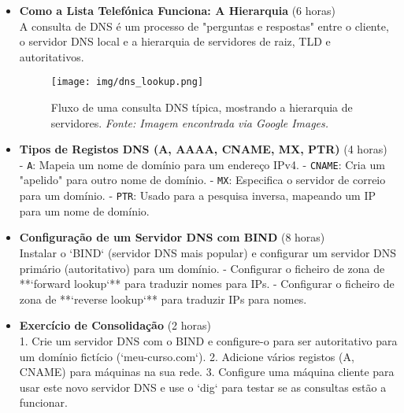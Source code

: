 \documentclass[10pt,a4paper]{article}
\begin{document}
	\begin{itemize}
		\item \textbf{Como a Lista Telefónica Funciona: A Hierarquia} (6 horas) \\
		A consulta de DNS é um processo de "perguntas e respostas" entre o cliente, o servidor DNS local e a hierarquia de servidores de raiz, TLD e autoritativos.
		
		\begin{figure}[h]
			\centering
			\texttt{[image: img/dns\_lookup.png]}
			\caption{Fluxo de uma consulta DNS típica, mostrando a hierarquia de servidores. \textit{Fonte: Imagem encontrada via Google Images.}}
			\label{fig:dns_lookup}
		\end{figure}
		
		\item \textbf{Tipos de Registos DNS (A, AAAA, CNAME, MX, PTR)} (4 horas) \\
		- \texttt{A}: Mapeia um nome de domínio para um endereço IPv4.
		- \texttt{CNAME}: Cria um "apelido" para outro nome de domínio.
		- \texttt{MX}: Especifica o servidor de correio para um domínio.
		- \texttt{PTR}: Usado para a pesquisa inversa, mapeando um IP para um nome de domínio.
		
		\item \textbf{Configuração de um Servidor DNS com BIND} (8 horas) \\
		Instalar o `BIND` (servidor DNS mais popular) e configurar um servidor DNS primário (autoritativo) para um domínio.
		- Configurar o ficheiro de zona de **`forward lookup`** para traduzir nomes para IPs.
		- Configurar o ficheiro de zona de **`reverse lookup`** para traduzir IPs para nomes.
		
		\item \textbf{Exercício de Consolidação} (2 horas) \\
		1. Crie um servidor DNS com o BIND e configure-o para ser autoritativo para um domínio fictício (`meu-curso.com`).
		2. Adicione vários registos (A, CNAME) para máquinas na sua rede.
		3. Configure uma máquina cliente para usar este novo servidor DNS e use o `dig` para testar se as consultas estão a funcionar.
	\end{itemize}
\end{document}

